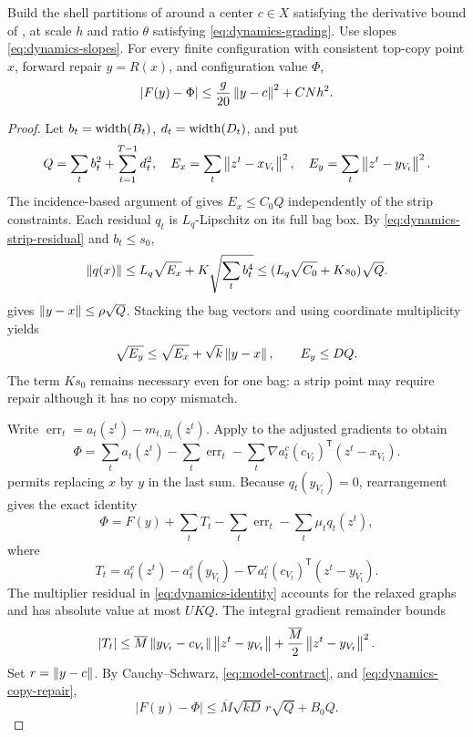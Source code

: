 \begin{lemma}\label{lem:dynamics-error}
Build the shell partitions of  around a center
$c\in X$ satisfying the derivative bound of
, at scale $h$ and ratio $\theta$ satisfying
\eqref{eq:dynamics-grading}. Use slopes \eqref{eq:dynamics-slopes}.
For every finite configuration with consistent top-copy point $x$,
forward repair $y=R(x)$, and configuration value $\Phi$,
\begin{equation}\label{eq:dynamics-error-final}
 |F(y)-\Phi|\le\frac g{20}\left\lVert y-c\right\rVert^2+CNh^2.
\end{equation}
\end{lemma}
\begin{proof}
Let $b_t=\operatorname{width}(B_t)$, $d_t=\operatorname{width}(D_t)$, and put
\[
 Q=\sum_t b_t^2+\sum_{t=1}^{T-1}d_t^2,\quad
 E_x=\sum_t\left\lVert z^t-x_{V_t}\right\rVert^2,\quad
 E_y=\sum_t\left\lVert z^t-y_{V_t}\right\rVert^2.
\]
The incidence-based argument of  gives
$E_x\le C_0Q$ independently of the strip constraints. Each residual
$q_t$ is $L_q$-Lipschitz on its full bag box. By
\eqref{eq:dynamics-strip-residual} and $b_t\le s_0$,
\[
 \left\lVert q(x)\right\rVert\le L_q\sqrt{E_x}+K\sqrt{\sum_t b_t^4}
             \le(L_q\sqrt{C_0}+Ks_0)\sqrt Q.
\]
 gives $\left\lVert y-x\right\rVert\le\rho\sqrt Q$.
Stacking the bag vectors and using coordinate multiplicity yields
\begin{equation}\label{eq:dynamics-copy-repair}
 \sqrt{E_y}\le\sqrt{E_x}+\sqrt{k}\left\lVert y-x\right\rVert,\qquad E_y\le DQ.
\end{equation}
The term $Ks_0$ remains necessary even for one bag: a strip point may
require repair although it has no copy mismatch.

Write $\operatorname{err}_t=a_t(z^t)-m_{t,B_t}(z^t)$. Apply
 to the adjusted gradients to obtain
\[
 \Phi=\sum_ta_t(z^t)-\sum_t\operatorname{err}_t
       -\sum_t\nabla a_t^c(c_{V_t})^{\mathsf T}(z^t-x_{V_t}).
\]
 permits replacing $x$ by $y$ in the last
sum. Because $q_t(y_{V_t})=0$, rearrangement gives the exact identity
\begin{equation}\label{eq:dynamics-identity}
 \Phi=F(y)+\sum_tT_t-\sum_t\operatorname{err}_t
                              -\sum_t\mu_tq_t(z^t),
\end{equation}
where
\[
 T_t=a_t^c(z^t)-a_t^c(y_{V_t})
                -\nabla a_t^c(c_{V_t})^{\mathsf T}(z^t-y_{V_t}).
\]
The multiplier residual in \eqref{eq:dynamics-identity} accounts for
the relaxed graphs and has absolute value at most $UKQ$.
The integral gradient remainder bounds
\[
 |T_t|\le\overline M\left\lVert y_{V_t}-c_{V_t}\right\rVert\left\lVert z^t-y_{V_t}\right\rVert
                     +\frac{\overline M}{2}\left\lVert z^t-y_{V_t}\right\rVert^2.
\]
Set $r=\left\lVert y-c\right\rVert$. By Cauchy--Schwarz,
\eqref{eq:model-contract}, and \eqref{eq:dynamics-copy-repair},
\begin{equation}\label{eq:dynamics-error-q}
 |F(y)-\Phi|\le\overline M\sqrt{kD}\,r\sqrt Q+B_0Q.
\end{equation}


\end{proof}
